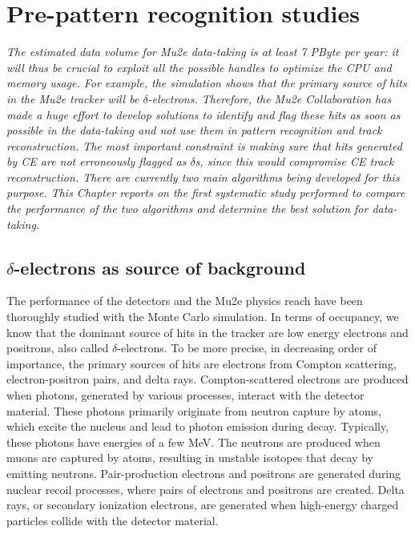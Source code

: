 \chapter{Pre-pattern recognition studies}\label{delta}
\textit{
The estimated data volume for Mu2e data-taking 
is at least 7 PByte per year: it will thus be crucial to 
exploit all the possible handles to optimize 
the CPU and memory usage. For example, the simulation 
shows that the primary source of hits in the 
Mu2e tracker will be $\delta$-electrons. 
Therefore, the Mu2e Collaboration has made 
a huge effort to develop solutions to identify 
and flag these hits as soon as possible in the 
data-taking and not use them in pattern 
recognition and track reconstruction. 
The most important constraint is 
making sure that hits generated by CE are 
not erroneously flagged as $\delta$s, 
since this would compromise CE track reconstruction. 
There are currently two main algorithms being 
developed for this purpose. This Chapter reports 
on the first systematic study performed to compare 
the performance of the two algorithms and determine 
the best solution for data-taking. }



\section{$\delta$-electrons as source of background}

The performance of the detectors and the Mu2e 
physics reach have been thoroughly studied with 
the Monte Carlo simulation. In terms of 
occupancy, we know that the dominant 
source of hits in the tracker are low energy electrons and positrons, also called 
$\delta$-electrons. To be more precise, in 
decreasing order of importance, the primary sources of hits are 
electrons from Compton scattering, electron-positron pairs, 
and delta rays. Compton-scattered electrons are produced 
when photons, generated by various processes, 
interact with the detector material. These photons primarily 
originate from neutron capture by atoms, which excite the 
nucleus and lead  
to photon emission during decay. Typically, 
these photons have 
energies of a few MeV. The neutrons are 
produced when muons are 
captured by atoms, resulting in unstable 
isotopes that decay by 
emitting neutrons. Pair-production 
electrons and positrons are 
generated during nuclear recoil 
processes, where pairs of electrons 
and positrons are created. Delta rays, 
or secondary ionization electrons, 
are generated when high-energy 
charged particles collide with the detector material.


